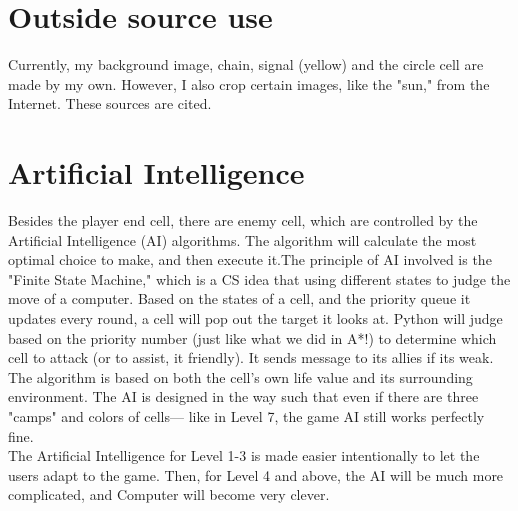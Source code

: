 \documentclass[12pt]{article}
\begin{document}
\section{Outside source use}
Currently, my background image, chain, signal (yellow) and the circle cell are made by my own. However, I also crop certain images, like the "sun," from the Internet. These sources are cited.

\section{Artificial Intelligence}
Besides the player end cell, there are enemy cell, which are controlled by the Artificial Intelligence (AI) algorithms. The algorithm will calculate the most optimal choice to make, and then execute it.The principle of AI involved is the "Finite State Machine," which is a CS idea that using different states to judge the move of a computer. Based on the states of a cell, and the priority queue it updates every round, a cell will pop out the target it looks at. Python will judge based on the priority number (just like what we did in A*!) to determine which cell to
attack (or to assist, it friendly). It sends message to its allies if its weak. The algorithm is based on both the cell's own life value and its surrounding environment. The AI is designed in the
way such that even if there are three "camps" and colors of cells--- like in Level 7, the game AI still works perfectly fine. \\

\noindent The Artificial Intelligence for Level 1-3 is made easier intentionally to let the users adapt to the game. Then, for Level 4 and above, the AI will be much more complicated, and 
Computer will become very clever.\\
\end{document}
